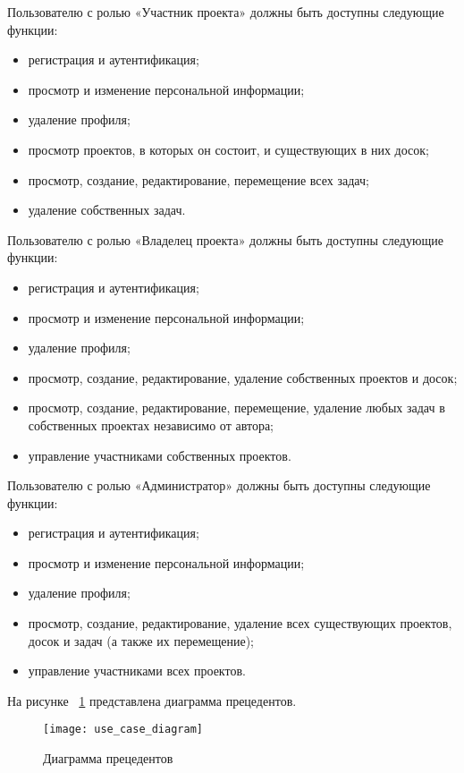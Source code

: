 Пользователю  с ролью «Участник проекта» должны  быть доступны следующие функции:
\begin{itemize}
	\item регистрация и аутентификация;
	\item просмотр и изменение персональной информации;
	\item удаление профиля;
	\item просмотр проектов, в которых он состоит, и существующих в них досок;
	\item просмотр, создание, редактирование, перемещение всех задач;
	\item удаление собственных задач.
\end{itemize}

Пользователю  с ролью «Владелец проекта» должны  быть доступны следующие функции:
\begin{itemize}
	\item регистрация и аутентификация;
	\item просмотр и изменение персональной информации;
	\item удаление профиля;
	\item просмотр, создание, редактирование, удаление собственных проектов и досок;
	\item просмотр, создание, редактирование, перемещение, удаление любых задач в собственных проектах независимо от автора;
	\item управление участниками собственных проектов.
\end{itemize}

Пользователю  с ролью «Администратор» должны  быть доступны следующие функции:
\begin{itemize}
	\item регистрация и аутентификация;
	\item просмотр и изменение персональной информации;
	\item удаление профиля;
	\item просмотр, создание, редактирование, удаление всех существующих проектов, досок и задач (а также их перемещение);
	\item управление участниками всех проектов.
\end{itemize}

На рисунке ~\ref{use_case_diagram:image} представлена диаграмма прецедентов.

\begin{figure}[H]
	\texttt{[image: use\_case\_diagram]}
	\caption{Диаграмма прецедентов}
	\label{use_case_diagram:image}
\end{figure}


